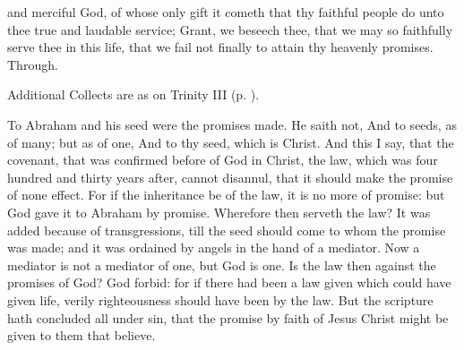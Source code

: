 \collect
{} and merciful God, of whose only gift it cometh that thy faithful people do unto thee true and laudable service; Grant, we beseech thee, that we may so faithfully serve thee in this life, that we fail not finally to attain thy heavenly promises. Through.
\begin{rubric}
    Additional Collects are as on Trinity III (p. \pageref{TrinityIII}).
\end{rubric}

 To Abraham and his seed were the promises made. He saith not, And to seeds, as of many; but as of one, And to thy seed, which is Christ. And this I say, that the covenant, that was confirmed before of God in Christ, the law, which was four hundred and thirty years after, cannot disannul, that it should make the promise of none effect. For if the inheritance be of the law, it is no more of promise: but God gave it to Abraham by promise. Wherefore then serveth the law? It was added because of transgressions, till the seed should come to whom the promise was made; and it was ordained by angels in the hand of a mediator. Now a mediator is not a mediator of one, but God is one. Is the law then against the promises of God? God forbid: for if there had been a law given which could have given life, verily righteousness should have been by the law. But the scripture hath concluded all under sin, that the promise by faith of Jesus Christ might be given to them that believe.


